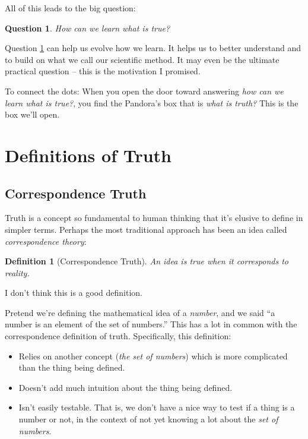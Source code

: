 \documentclass[11pt, oneside]{article}   	%
\newtheorem{question}{Question}
\newtheorem{defn}{Definition}
\begin{document}
All of this leads to the big question:

\begin{question}\label{q3}
    How can we learn what is true?
\end{question}

Question \ref{q3} can help us evolve how we learn.
It helps us to better understand and to build on what we call our
scientific method.
It may even
be the ultimate practical question -- this is the motivation I promised.

To connect the dots: When you open the door toward answering {\em how can we
learn what is true?}, you find the
Pandora's box that is {\em what is truth?} This is the box we'll open.

\section{Definitions of Truth}

\subsection{Correspondence Truth}

Truth is a concept so fundamental to human thinking that it's elusive to define
in simpler terms.
Perhaps the most traditional approach has been an idea called
{\em correspondence theory}\/:

\begin{defn}[Correspondence Truth]\label{d1}
    An idea is true when it corresponds to reality.
\end{defn}

I don't think this is a good definition.

Pretend we're defining the mathematical idea of a {\em number}, and we said
``a number is an element of the set of numbers.'' This 
has a lot in common with the correspondence definition of truth.
Specifically, this definition:
\begin{itemize}
    \item Relies on another concept ({\em the set of numbers})
        which is more complicated than the thing
        being defined. 
    \item Doesn't add much intuition about the thing being defined.
    \item Isn't easily testable. That is, we don't have a nice
        way to test if a thing is a number or not, in the context of not yet
        knowing a lot about the {\em set of numbers}.
\end{itemize}
\end{document}
